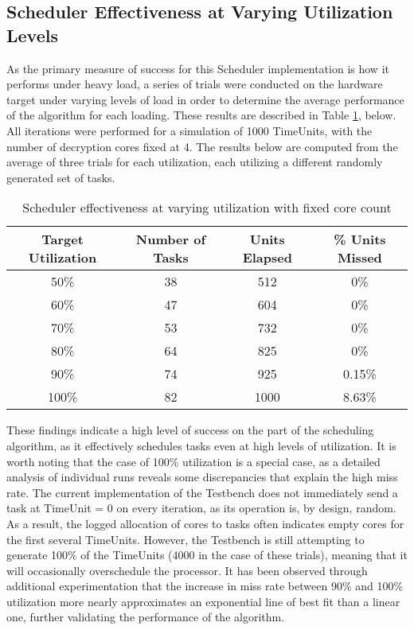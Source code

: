 \subsection{Scheduler Effectiveness at Varying Utilization Levels}\label{subsec:SchedulerDataUtilVary}
As the primary measure of success for this Scheduler implementation is how it performs under heavy load, a series of trials were conducted on the hardware target under varying levels of load in order to determine the average performance of the algorithm for each loading. These results are described in Table \ref{table:SchedEffectivenessUtilVary}, below. All iterations were performed for a simulation of 1000 TimeUnits, with the number of decryption cores fixed at 4. The results below are computed from the average of three trials for each utilization, each utilizing a different randomly generated set of tasks.

\begin{table}[ht!]
    \centering\begin{tabular}{| c | c | c | c |}
        \hline
        Target Utilization & Number of Tasks & Units Elapsed & \% Units Missed \\
        \hline
        50\% & 38 & 512 & 0\% \\
        60\% & 47 & 604 & 0\% \\
        70\% & 53 & 732 & 0\% \\
        80\% & 64 & 825 & 0\% \\
        90\% & 74 & 925 & 0.15\% \\
        100\% & 82 & 1000 & 8.63\% \\
        \hline
    \end{tabular}
    \caption{Scheduler effectiveness at varying utilization with fixed core count}
    \label{table:SchedEffectivenessUtilVary}
\end{table}

These findings indicate a high level of success on the part of the scheduling algorithm, as it effectively schedules tasks even at high levels of utilization. It is worth noting that the case of 100\% utilization is a special case, as a detailed analysis of individual runs reveals some discrepancies that explain the high miss rate. The current implementation of the Testbench does not immediately send a task at TimeUnit = 0 on every iteration, as its operation is, by design, random. As a result, the logged allocation of cores to tasks often indicates empty cores for the first several TimeUnits. However, the Testbench is still attempting to generate 100\% of the TimeUnits (4000 in the case of these trials), meaning that it will occasionally overschedule the processor. It has been observed through additional experimentation that the increase in miss rate between 90\% and 100\% utilization more nearly approximates an exponential line of best fit than a linear one, further validating the performance of the algorithm.

